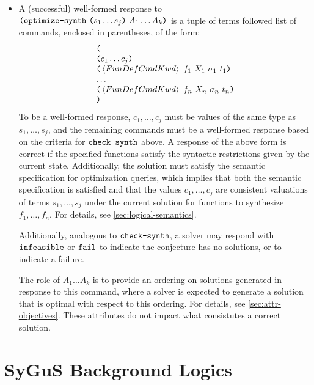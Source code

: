 \documentclass[english,a4paper,10pt]{article}
\begin{document}
\begin{itemize}
\item
A (successful) well-formed response to $\texttt{(}\texttt{optimize-synth}\mbox{ }\texttt{(}s_1 \ldots s_j\texttt{)}\mbox{ } A_1 \ldots A_k\texttt{)}$
is a tuple of terms followed list of commands, enclosed in parentheses, of the form:
\[
\begin{array}{l}
\texttt{(}\\
\texttt{(}c_1 \ldots c_j\texttt{)}\\
\texttt{(}\left\langle FunDefCmdKwd\right\rangle\mbox{ }f_{1}\mbox{ }X_{1}\mbox{ }\sigma_{1}\mbox{ }t_{1}\texttt{)}\\
\ldots\\
\texttt{(}\left\langle FunDefCmdKwd\right\rangle\mbox{ }f_{n}\mbox{ }X_{n}\mbox{ }\sigma_{n}\mbox{ }t_{n}\texttt{)}\\
\texttt{)}
\end{array}
\]
To be a well-formed response, 
$c_1, \ldots, c_j$ must be values of the same type as $s_1, \ldots, s_j$,
and the remaining commands must be a well-formed response based on the criteria
for $\texttt{check-synth}$ above.
A response of the above form is correct if
the specified functions satisfy the syntactic restrictions given by
the current state.
Additionally, the solution must satisfy
the semantic specification for optimization queries, which
implies that both the semantic specification is satisfied
and that the values $c_1, \ldots, c_j$
are consistent valuations of terms $s_1, \ldots, s_j$
under the current solution for functions to synthesize $f_1, \ldots, f_n$.
For details, see \cref{sec:logical-semantics}.

Additionally, analogous to $\texttt{check-synth}$, 
a solver may respond
with ${\tt infeasible}$ or ${\tt fail}$ to indicate
the conjecture has no solutions, or to indicate a failure.

The role of $A_1 \ldots A_k$ is to provide an ordering on solutions
generated in response to this command, where a solver is expected to generate
a solution that is optimal with respect to this ordering.
For details, see \cref{sec:attr-objectives}.
These attributes do not impact what consistutes a correct solution.

\end{itemize}


\section{SyGuS Background Logics}%
\label{sec:sygus-logic}
\end{document}
